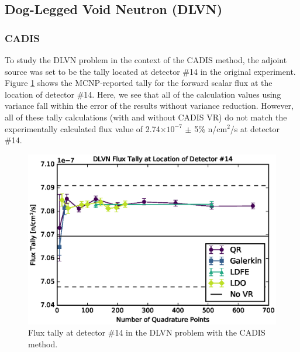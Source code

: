\documentclass{article} %
\newcommand{\E}[1]{$\times10^{#1}$}
\begin{document}
\FloatBarrier
\subsection{Dog-Legged Void Neutron (DLVN)}

\subsubsection{CADIS}

To study the DLVN problem in the context of the CADIS method, the adjoint
source was set to be the tally located at detector \#14 in the original
experiment. Figure \ref{dlvn-cad-tally} shows the MCNP-reported tally for the
forward scalar flux at the location of detector \#14. Here, we see that all of
the calculation values using variance fall within the error of the results
without variance reduction. However, all of these tally calculations (with and
without CADIS VR) do not match the experimentally calculated flux value of
2.74\E{-7} $\pm$ 5\% n/cm$^2$/s at detector \#14.

\begin{figure}[!htb]
\centering
\includegraphics[max height=0.445\textheight]{dlvn-cadis-tally.eps}
\caption{Flux tally at detector \#14 in the DLVN problem with the CADIS method.}
\label{dlvn-cad-tally}
\end{figure}
\end{document}

